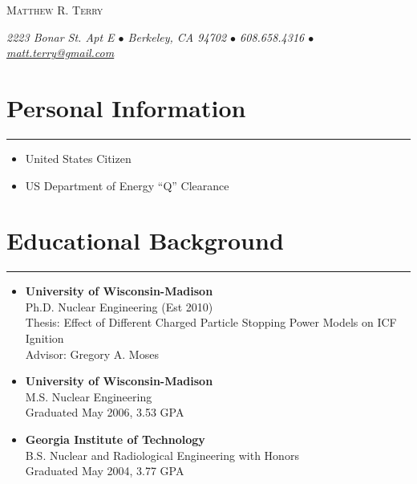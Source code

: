 \documentclass[letterpaper,11pt]{article}
\def\name{Matthew R. Terry}
\begin{document}
\begin{center}
	{\huge\scshape \name}

	\textit{%
		2223 Bonar St. Apt E $\bullet$
		Berkeley, CA 94702 $\bullet$
		608.658.4316 $\bullet$
		\href{mailto:matt.terry@gmail.com}{matt.terry@gmail.com}
	}
\end{center}


\section*{Personal Information}
\hrule
\vspace{0.05in}
\begin{itemize}
	\item United States Citizen
	\item US Department of Energy ``Q'' Clearance
\end{itemize}


\section*{Educational Background}
\hrule
\vspace{0.05in}
\begin{itemize}
	\item 
		\textbf{University of Wisconsin-Madison} \\
		Ph.D. Nuclear Engineering (Est 2010) \\
  		Thesis: Effect of Different Charged Particle Stopping Power Models on ICF Ignition \\
		Advisor: Gregory A. Moses
	\item 
		\textbf{University of Wisconsin-Madison} \\
		M.S. Nuclear Engineering \\
		Graduated May 2006, 3.53 GPA 
	\item 
		\textbf{Georgia Institute of Technology} \\
		B.S. Nuclear and Radiological Engineering with Honors \\
		Graduated May 2004, 3.77 GPA
\end{itemize}
\end{document}
